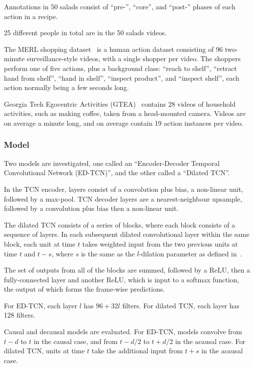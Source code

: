 \documentclass[a4paper, 12pt]{article}
\begin{document}
Annotations in 50 salads consist of ``pre-'', ``core'', and ``post-'' phases of
each action in a recipe.

25 different people in total are in the 50 salads videos.

The MERL shopping dataset~\cite{merl-shopping-singh} is a human action dataset
consisting of 96 two-minute surveillance-style videos, with a single shopper
per video.  The shoppers perform one of five actions, plus a background class:
``reach to shelf'', ``retract hand from shelf'', ``hand in shelf'', ``inspect
product'', and ``inspect shelf'', each action normally being a few seconds
long.

Georgia Tech Egocentric Activities (GTEA)~\cite{Fathi:2011:LRO:2191740.2191834}
contains 28 videos of household activities, such as making coffee, taken from a
head-mounted camera.  Videos are on average a minute long, and on average
contain 19 action instances per video.

\subsubsection{Model}

Two models are investigated, one called an ``Encoder-Decoder Temporal
Convolutional Network (ED-TCN)'', and the other called a ``Dilated TCN''.

In the TCN encoder, layers consist of a convolution plus bias, a non-linear
unit, followed by a max-pool. TCN decoder layers are a nearest-neighbour
upsample, followed by a convolution plus bias then a non-linear unit.

The dilated TCN consists of a series of blocks, where each block consists of a
sequence of layers. In each subsequent dilated convolutional layer within the
same block, each unit at time $t$ takes weighted input from the two previous
units at time $t$ and $t - s$, where $s$ is the same as the $l$-dilation
parameter as defined in~\cite{DBLP:journals/corr/YuK15}.

The set of outputs from all of the blocks are summed, followed by a ReLU, then
a fully-connected layer and another ReLU\@, which is input to a softmax
function, the output of which forms the frame-wise predictions.

For ED-TCN, each layer $l$ has $96 + 32l$ filters. For dilated TCN, each layer
has 128 filters.

Causal and decausal models are evaluated. For ED-TCN, models convolve from $t -
d$ to $t$ in the causal case, and from $t - d/2$ to $t + d/2$ in the acausal
case. For dilated TCN, units at time $t$ take the additional input from $t + s$
in the acausal case.
\end{document}
